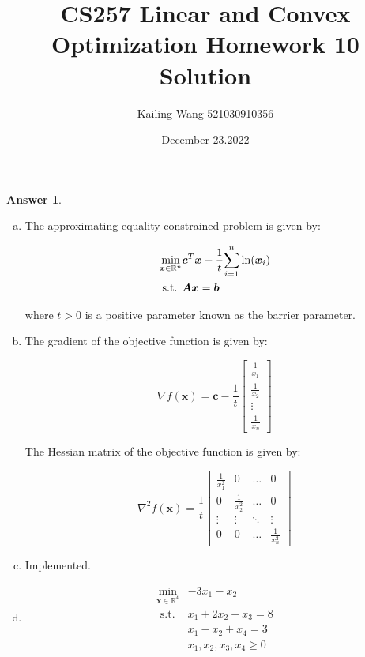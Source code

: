 \documentclass{article}
\theoremstyle{definition}
\newtheorem{ans}{Answer}
\begin{document}
	\title{CS257 Linear and Convex Optimization Homework 10 Solution}
	\author{Kailing Wang 521030910356}
	\date{December 23.2022}
	\maketitle
	\begin{ans}
		~
		
		\begin{enumerate}[(a)]
			\item The approximating equality constrained problem is given by:
			
			$$
			\begin{aligned}
				\underset{\boldsymbol{x} \in \mathbb{R}^{n}}{\min} & \boldsymbol{c}^{T} \boldsymbol{x} - \frac{1}{t} \overunderset{n}{i=1}{\sum}\ln(\boldsymbol{x}_i) \\
				\text { s.t. } & \boldsymbol{A} \boldsymbol{x}=\boldsymbol{b}
			\end{aligned}
			$$
			
			where $t > 0$ is a positive parameter known as the barrier parameter.
			
			\item The gradient of the objective function is given by:
			
			$$ \nabla f(\boldsymbol{x}) = \boldsymbol{c} - \frac{1}{t} \begin{bmatrix} \frac{1}{x_1} \\ \frac{1}{x_2} \\ \vdots \\ \frac{1}{x_n} \end{bmatrix} $$
			
			The Hessian matrix of the objective function is given by:
			
			$$ \nabla^2 f(\boldsymbol{x}) = \frac{1}{t} \begin{bmatrix} \frac{1}{x_1^2} & 0 & \dots & 0 \\ 0 & \frac{1}{x_2^2} & \dots & 0 \\ \vdots & \vdots & \ddots & \vdots \\ 0 & 0 & \dots & \frac{1}{x_n^2} \end{bmatrix} $$
			
			\item Implemented.
			
			\item
			
			$$
			\begin{aligned}
				\min_{\boldsymbol{x} \in \mathbb{R}^{4}} & -3 x_{1}-x_{2} \\
				\text { s.t. } & x_{1}+2 x_{2}+x_{3}=8 \\
				& x_{1}-x_{2}+x_{4}=3 \\
				& x_{1}, x_{2}, x_{3}, x_{4} \geq 0
			\end{aligned}
			$$
			

\end{enumerate}
\end{ans}
\end{document}
